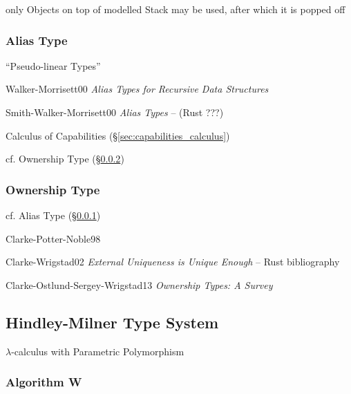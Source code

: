 only Objects on top of modelled Stack may be used, after which it is
popped off



\subsubsection{Alias Type}\label{sec:alias_type}


``Pseudo-linear Types''

Walker-Morrisett00 \emph{Alias Types for Recursive Data Structures}

Smith-Walker-Morrisett00 \emph{Alias Types} -- (Rust ???) %

Calculus of Capabilities (\S\ref{sec:capabilities_calculus})

cf. Ownership Type (\S\ref{sec:ownership_type})



\subsubsection{Ownership Type}\label{sec:ownership_type}

cf. Alias Type (\S\ref{sec:alias_type})

Clarke-Potter-Noble98

Clarke-Wrigstad02 \emph{External Uniqueness is Unique Enough} -- Rust
bibliography

Clarke-Ostlund-Sergey-Wrigstad13 \emph{Ownership Types: A Survey}



\subsection{Hindley-Milner Type System}\label{sec:hindley_milner}

$\lambda$-calculus with Parametric Polymorphism



\subsubsection{Algorithm W}\label{sec:algorithm_w}



